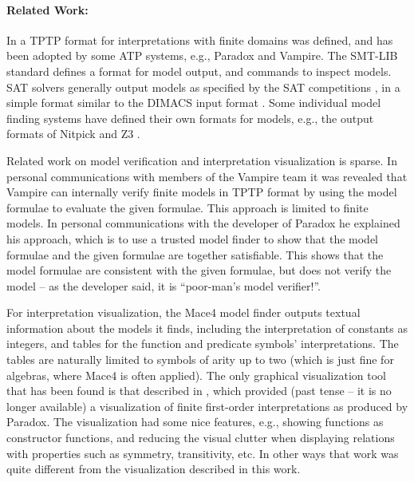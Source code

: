 \documentclass[letterpaper]{article}
\begin{document}
\paragraph{Related Work:}
In \cite{SS+06} a TPTP format for interpretations with finite domains was defined, and has been 
adopted by some ATP systems, e.g., Paradox and Vampire.
The SMT-LIB standard \cite{BFT17} defines a format for model output, and commands to inspect 
models.  
SAT solvers generally output models as specified by the SAT competitions \cite{JL+12}, in a 
simple format similar to the DIMACS input format \cite{Bab93}.
Some individual model finding systems have defined their own formats for models, e.g., the 
output formats of Nitpick and Z3 \cite{dMB08}.

Related work on model verification and interpretation visualization is sparse.
In personal communications with members of the Vampire team it was revealed that Vampire can 
internally verify finite models in TPTP format by using the model formulae to evaluate the given 
formulae.
This approach 
is limited to finite models.
In personal communications with the developer of Paradox he explained his approach, which is to 
use a trusted model finder to show that the model formulae and the given formulae are together 
satisfiable.
This shows that the model formulae are consistent with the given formulae, but does not verify 
the model -- as the developer said, it is ``poor-man's model verifier!''.

For interpretation visualization, the Mace4 model finder \cite{McC03-MACE4-TR} outputs textual 
information about the models it finds, including the interpretation of constants as integers,
and tables for the function and predicate symbols' interpretations. 
The tables are naturally limited to symbols of arity up to two (which is just fine for algebras, 
where Mace4 is often applied).
The only graphical visualization tool that has been found is that described in \cite{Sch13-MS},
which provided (past tense -- it is no longer available) a visualization of finite first-order 
interpretations as produced by Paradox.
The visualization had some nice features, e.g., showing functions as constructor functions, and 
reducing the visual clutter when displaying relations with properties such as symmetry, 
transitivity, etc.
In other ways that work was quite different from the visualization described in this work.
\end{document}
